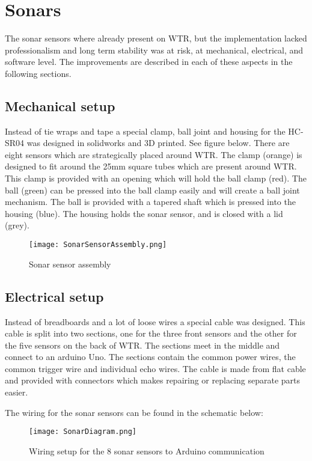 
\section{Sonars}
The sonar sensors where already present on WTR, but the implementation lacked professionalism and long term stability was at risk, at mechanical, electrical, and software level.
The improvements are described in each of these aspects in the following sections.

\subsection{Mechanical setup}
Instead of tie wraps and tape a special clamp, ball joint and housing for the HC-SR04 was designed in solidworks and 3D printed. See figure below.
There are eight sensors which are strategically placed around WTR.
The clamp (orange) is designed to fit around the 25mm square tubes which are present around WTR. 
This clamp is provided with an opening which will hold the ball clamp (red).
The ball (green) can be pressed into the ball clamp easily and will create a ball joint mechanism.
The ball is provided with a tapered shaft which is pressed into the housing (blue).
The housing holds the sonar sensor, and is closed with a lid (grey).

\begin{figure}[H]
\centering
\texttt{[image: SonarSensorAssembly.png]}
\caption{Sonar sensor assembly}
\label{fig::sonarassembly}
\end{figure}


\subsection{Electrical setup}
Instead of breadboards and a lot of loose wires a special cable was designed. 
This cable is split into two sections, one for the three front sensors and the other for the five sensors on the back of WTR.
The sections meet in the middle and connect to an arduino Uno.
The sections contain the common power wires, the common trigger wire and individual echo wires.
The cable is made from flat cable and provided with connectors which makes repairing or replacing separate parts easier.

The wiring for the sonar sensors can be found in the schematic below:

\begin{figure}[H]
\centering
\texttt{[image: SonarDiagram.png]}
\caption{Wiring setup for the 8 sonar sensors to Arduino communication}
\label{fig::wiringsonar}
\end{figure}

 
    